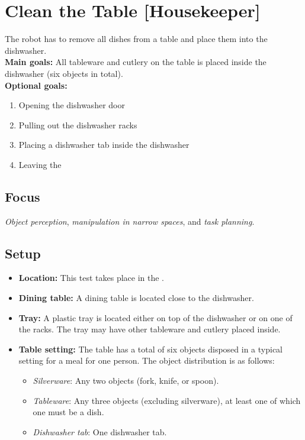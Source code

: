\section{Clean the Table [Housekeeper]}
\label{test:clean-the-table}
The robot has to remove all dishes from a table and place them into the dishwasher.\\

\noindent \textbf{Main goals:} All tableware and cutlery on the table is placed inside the dishwasher (six objects in total).\\

\noindent \textbf{Optional goals:}
\begin{enumerate}[nosep]
	\item Opening the dishwasher door
	\item Pulling out the dishwasher racks
	\item Placing a dishwasher tab inside the dishwasher
	\item Leaving the \Arena{}
\end{enumerate}

\subsection*{Focus}
\emph{Object perception}, \emph{manipulation in narrow spaces}, and \emph{task planning}.

\subsection*{Setup}
\begin{itemize}[nosep]
	\item \textbf{Location:} This test takes place in the \Arena{}.
	\item \textbf{Dining table:} A dining table is located close to the dishwasher.
	\item \textbf{Tray:} A plastic tray is located either on top of the dishwasher or on one of the racks. The tray may have other tableware and cutlery placed inside.
	\item \textbf{Table setting:} The table has a total of six objects disposed in a typical setting for a meal for one person.
	The object distribution is as follows:
	\begin{itemize}[nosep]
		\item\textit{Silverware}: Any two objects (fork, knife, or spoon).
		\item\textit{Tableware}: Any three objects (excluding silverware), at least one of which one must be a dish.
		\item\textit{Dishwasher tab}: One dishwasher tab.
	\end{itemize}
\end{itemize}


